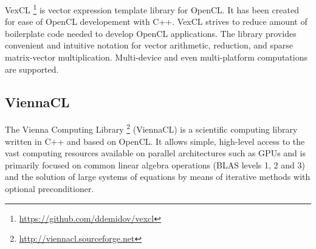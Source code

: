 \documentclass[1p]{elsarticle}
\begin{document}
VexCL%
\footnote{\href{https://github.com/ddemidov/vexcl}{https://github.com/ddemidov/vexcl}}
is vector expression template library for OpenCL. It has been created for ease
of OpenCL developement with C++.  VexCL strives to reduce amount of boilerplate
code needed to develop OpenCL applications. The library provides convenient and
intuitive notation for vector arithmetic, reduction, and sparse matrix-vector
multiplication. Multi-device and even multi-platform computations are
supported. 

\subsection{ViennaCL}

The Vienna Computing Library%
\footnote{\href{http://viennacl.sourceforge.net}{http://viennacl.sourceforge.net}}
(ViennaCL) is a scientific computing library written in C++ and based on
OpenCL. It allows simple, high-level access to the vast computing resources
available on parallel architectures such as GPUs and is primarily focused on
common linear algebra operations (BLAS levels 1, 2 and 3) and the solution of
large systems of equations by means of iterative methods with optional
preconditioner.
\end{document}
